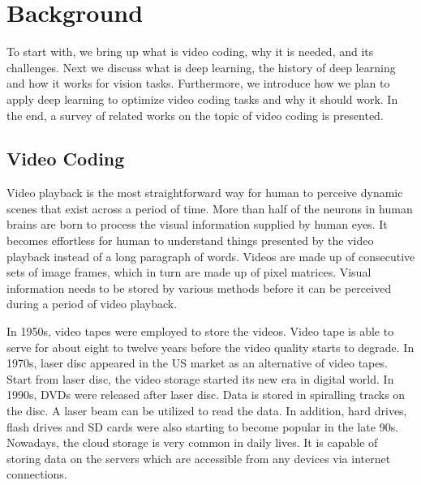 \chapter{Background}\label{ch:chapter2} %
%
%
To start with, we bring up what is video coding, why it is needed, and
its challenges.
Next we discuss what is deep learning, the history of deep learning and how
it works for vision tasks.
Furthermore, we introduce how we plan to apply deep learning to optimize video
coding tasks and why it should work.
In the end, a survey of related works on the topic of video coding is presented.

%
\section{Video Coding}\label{sec:video-coding}
Video playback is the most straightforward way for human to perceive dynamic
scenes that exist across a period of time.
More than half of the neurons in human brains are born to process the visual
information supplied by human eyes.
It becomes effortless for human to understand things presented by
the video playback instead of a long paragraph of words.
Videos are made up of consecutive sets of image frames, which in turn
are made up of pixel matrices.
Visual information needs to be stored by various methods 
before it can be perceived during a period of video playback.

In 1950s, video tapes were employed to store the videos.
Video tape is able to serve for about eight to twelve years
before the video quality starts to degrade.
In 1970s, laser disc appeared in the US market as an alternative of video tapes.
Start from laser disc, the video storage started its new era in digital world.
In 1990s, DVDs were released after laser disc.
Data is stored in spiralling tracks on the disc.
A laser beam can be utilized to read the data.
In addition, hard drives, flash drives and SD cards were also starting to
become popular in the late 90s.
Nowadays, the cloud storage is very common in daily lives.
It is capable of storing data on the servers which are
accessible from any devices via internet connections.

